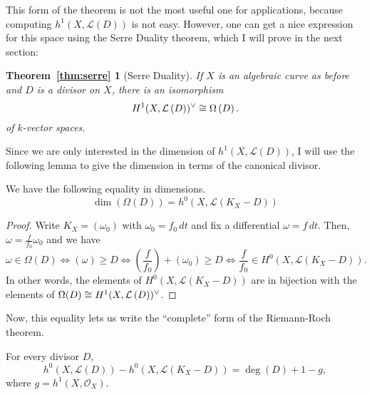 This form of the theorem is not the most useful one for applications,
because computing $h^{1}(X,\mathcal{L}(D))$ is not easy. However, one can
get a nice expression for this space using the Serre Duality theorem, which
I will prove in the next section:
\newtheorem*{thm:serre}{Theorem~\ref{thm:serre}}
\begin{thm:serre}[Serre Duality]
  If $X$ is an algebraic curve as before
  and $D$ is a divisor on $X$, there is an isomorphism
  \[
    H^1(X,\mathcal{L}\left(D\right))^{\vee}\cong \Omega\left(D\right).
  \]
  of $k$-vector spaces.
\end{thm:serre}
Since we are only interested in the dimension of $h^{1}(X,\mathcal{L}(D))$,
I will use the following lemma to give the dimension in terms of the
canonical divisor.
\begin{lemm}\label{lemm:diffs_dim}
  We have the following equality in dimensions.
  \[\dim\left(\Omega(D)\right)=h^{0}(X,\mathcal{L}(K_{X}-D))\]
\end{lemm}
\begin{proof}
  Write $K_{X}=(\omega_{0})$ with $\omega_{0}=f_{0}\,dt$ and fix a
  differential $\omega=f\,dt$. Then, $\omega=\frac{f}{f_{0}}\omega_{0}$
  and we have
  \[
    \omega\in\Omega(D)\iff (\omega)\geq D
    \iff\left(\frac{f}{f_{0}}\right)+(\omega_{0})\geq D\iff
    \frac{f}{f_{0}}\in H^{0}(X,\mathcal{L}(K_{X}-D)).
  \]
  In other words, the elements of $H^{0}(X,\mathcal{L}(K_{X}-D))$ are in
  bijection with the elements of $\Omega(D)\cong H^1(X,\mathcal{L}\left(D\right))^{\vee}$.
\end{proof}
Now, this equality lets us write the ``complete'' form of the Riemann-Roch
theorem.
\begin{thm}\label{thm:riemann_roch}
  For every divisor $D$,
  \[
    h^{0}(X, \mathcal{L}(D))-h^{0}(X, \mathcal{L}(K_{X}-D))=\deg(D)+1-g,
  \]
  where $g=h^{1}(X, \mathscr{O}_{X})$.
\end{thm}

